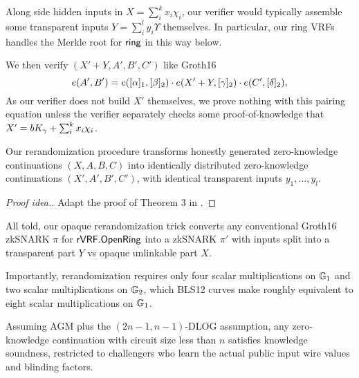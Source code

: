
Along side hidden inputs in $X = \sum_i^k x_i \chi_i$,
our verifier would typically assemble some transparent inputs
$Y = \sum_i^l y_i \Upsilon$ themselves.  In particular, our ring VRFs
handles the Merkle root \comring for $\mathsf{ring}$ in this way below.

We then verify $(X' + Y,A',B',C')$ like Groth16 
$$ e(A',B') = e([\alpha]_1, [\beta]_2) \cdot
 e(X' + Y, [\gamma]_2) \cdot e(C', [\delta]_2) , $$
As our verifier does not build $X'$ themselves, we prove nothing
with this pairing equation unless the verifier separately checks
 some proof-of-knowledge that $X' = b K_\gamma + \sum_i^k x_i \chi_i$.

\begin{lemma}\label{lem:unlinkable}
Our rerandomization procedure %
transforms honestly generated zero-knowledge continuations $(X,A,B,C)$
into identically distributed zero-knowledge continuations $(X',A',B',C')$,
with identical transparent inputs $y_1,\ldots,y_l$.
\end{lemma}

\begin{proof}[Proof idea.]
Adapt the proof of Theorem 3 in \cite[Appendix C, pp. 31]{RandomizationGroth16}.
\end{proof}


All told, our opaque rerandomization trick converts any conventional
Groth16 zkSNARK $\pi$ for ${\mathsf{rVRF}}.{\mathsf{OpenRing}}$ into a zkSNARK $\pi'$
with inputs split into a transparent part $Y$ vs opaque unlinkable part $X$.

Importantly, rerandomization requires only
 four scalar multiplications on ${\mathbb{G}}_1$ and
 two scalar multiplications on ${\mathbb{G}}_2$,
which  BLS12 curves make roughly equivalent to
 eight scalar multiplications on ${\mathbb{G}}_1$.


\begin{lemma}\label{lem:knowledge_soundness}
Assuming AGM plus the $(2n-1,n-1)$-DLOG assumption,
any zero-knowledge continuation with circuit size less than $n$
satisfies knowledge soundness, restricted to challengers
 who learn the actual public input wire values and blinding factors.
\end{lemma}

